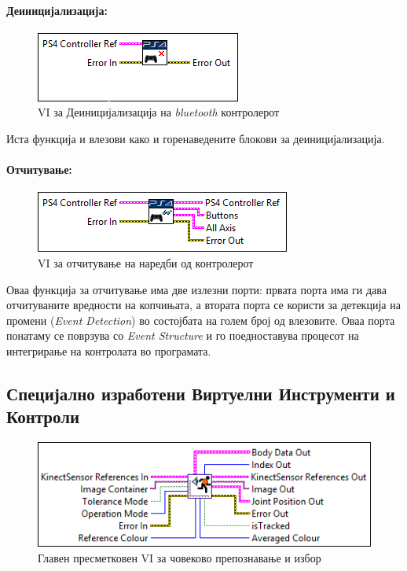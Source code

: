 \documentclass[12pt]{article}
\begin{document}
      \paragraph{Деиницијализација:\\}
	\begin{figure}[H]
	    \includegraphics[width=0.55\linewidth]{./images/controller_deinit_border.PNG}
		\caption{VI за Деиницијализација на \textit{bluetooth} контролерот}
	    \label{fig:controller_deinit.PNG}
	    \raggedright
	    \end{figure}
        Иста функција и влезови како и горенаведените блокови за деиницијализација.

      \paragraph{Отчитување:\\}
	\begin{figure}[H]
	    \includegraphics[width=0.55\linewidth]{./images/controller_read_border.PNG}
		\caption{VI за отчитување на наредби од контролерот}
	    \label{fig:controller_read.PNG}
	    \raggedright
	    \end{figure}
        Оваа функција за отчитување има две излезни порти: првата порта има ги дава отчитуваните вредности на копчињата, а втората порта се користи за детекција на промени (\textit{Event Detection}) во состојбата на голем број од влезовите. Оваа порта понатаму се поврзува со \textit{Event Structure} и го поедноставува процесот на интегрирање на контролата во програмата.

  \subsection{Специјално изработени Виртуелни Инструменти и Контроли}
  \label{sec:bodydetect}
	\begin{figure}[H]
	    \includegraphics[width=0.55\linewidth]{./images/humanDetect_border.PNG}
		\caption{Главен пресметковен VI за човеково препознавање и избор}
	    \label{fig:humanDetect.PNG}
	    \raggedright
	    \end{figure}
\end{document}
